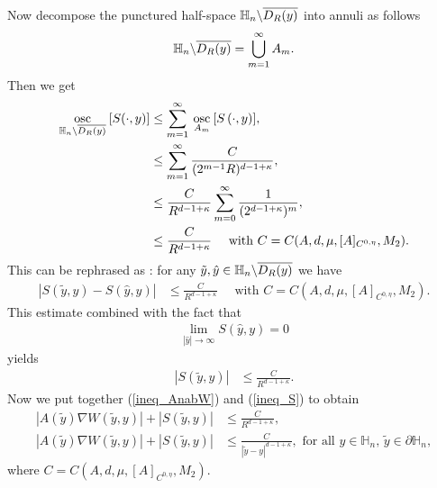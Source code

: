\documentclass[11pt, reqno]{amsart}
\theoremstyle{definition}
\theoremstyle{remark}
\numberwithin{equation}{section}
\newcommand{\bs}{\symbol{92}}
\DeclareMathOperator*{\osc}{osc}
\begin{document}
	\noindent Now decompose the punctured half-space $\mathbb{H}_n\bs \overline{D_R(y)}$ into annuli as follows
	\begin{align*}
		\mathbb{H}_n\bs \overline{D_R(y)} = \bigcup ^\infty_{m=1}  A_m.
	\end{align*}
	Then we get
	\begin{align*}
		\osc_{\mathbb{H}_n\bs \overline{D_R(y)}} \:	[S(\cdot,y)] &\leq \sum_{m=1}^\infty \: \osc_{A_m} \: [S\left( \cdot,y\right) ], \\
		&\leq \sum ^\infty_{m=1} \frac{C}{(2^{m-1}R)^{d-1+\kappa}}, \\
		&\leq  \frac{C}{R^{d-1+\kappa}}    \sum ^\infty_{m=0}  \frac{1}{(2^{d-1+\kappa})^m} ,\\
		&\leq  \frac{C}{R^{d-1+\kappa}}\quad  \mbox{  with }C=C(A, d, \mu, [A]_{C^{0,\eta}},M_2) .  
	\end{align*}
	This can be rephrased as : for any $\tilde{y},\hat{y}\in\mathbb{H}_n\bs \overline{D_R(y)}$ we have 
	\begin{align*}
		\left| S\!\left(\tilde{y},y\right)- S\!\left(\hat{y},y\right) \right|  &\leq \frac{C}{R^{d-1+\kappa}} \quad\mbox{ with } C=C(A, d, \mu, [A]_{C^{0,\eta}},M_2). 
	\end{align*}
	This estimate combined with the fact that 
	\begin{align*}
		\lim_{|\hat{y}|\rightarrow \infty}  S\!\left(\hat{y},y\right)=0
	\end{align*}
	yields 
	\begin{align}
		\left| S\!\left(\tilde{y},y\right) \right|  &\leq \frac{C}{R^{d-1+\kappa}}.\label{ineq_S}
	\end{align}
	Now we put together (\ref{ineq_AnabW}) and (\ref{ineq_S}) to obtain
	\begin{align*}
		\left| 	A(\tilde{y})\nabla W (\tilde{y},y) \right| +	\left| S(\tilde{y},y) \right|  &\leq \frac{C}{R^{d-1+\kappa}} , \\
		\left| 	A(\tilde{y})\nabla W (\tilde{y},y) \right| +	\left| S(\tilde{y},y) \right|  &\leq \frac{C}{|\tilde{y}-y|^{d-1+\kappa}} , \mbox{ for all }  y\in \mathbb{H}_n, \, \tilde{y}\in \partial \mathbb{H}_n,
	\end{align*}where  $C=C(A, d, \mu, [A]_{C^{0,\eta}},M_2)$.\\
	
\end{document}
